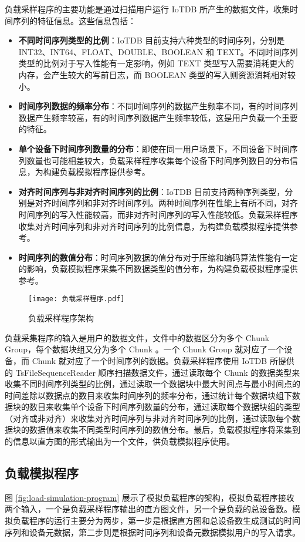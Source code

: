 负载采样程序的主要功能是通过扫描用户运行 IoTDB 所产生的数据文件，收集时间序列的特征信息。这些信息包括：
\begin{itemize}
  \item \textbf{不同时间序列类型的比例}：IoTDB 目前支持六种类型的时间序列，分别是 INT32、INT64、FLOAT、DOUBLE、BOOLEAN 和 TEXT。不同时间序列类型的比例对于写入性能有一定影响，例如 TEXT 类型写入需要消耗更大的内存，会产生较大的写前日志，而 BOOLEAN 类型的写入则资源消耗相对较小。
  \item \textbf{时间序列数据的频率分布}：不同时间序列的数据产生频率不同，有的时间序列数据产生频率较高，有的时间序列数据产生频率较低，这是用户负载一个重要的特征。
  \item \textbf{单个设备下时间序列数量的分布}：即使在同一用户场景下，不同设备下时间序列数量也可能相差较大，负载采样程序收集每个设备下时间序列数目的分布信息，为构建负载模拟程序提供参考。
  \item \textbf{对齐时间序列与非对齐时间序列的比例}：IoTDB 目前支持两种序列类型，分别是对齐时间序列和非对齐时间序列。两种时间序列在性能上有所不同，对齐时间序列的写入性能较高，而非对齐时间序列的写入性能较低。负载采样程序收集对齐时间序列和非对齐时间序列的比例信息，为构建负载模拟程序提供参考。
  \item \textbf{时间序列的数值分布}：时间序列数据的值分布对于压缩和编码算法性能有一定的影响，负载模拟程序采集不同数据类型的值分布，为构建负载模拟程序提供参考。
\end{itemize}

\begin{figure}
  \centering
  \texttt{[image: 负载采样程序.pdf]}
  \caption{负载采样程序架构}
  \label{fig:load-sampling-program}
\end{figure}

负载采集程序的输入是用户的数据文件，文件中的数据区分为多个 Chunk Group，每个数据块组又分为多个 Chunk 。一个 Chunk Group 就对应了一个设备，而 Chunk 就对应了一个时间序列的数据。负载采样程序使用 IoTDB 所提供的 TsFileSequenceReader 顺序扫描数据文件，通过读取每个 Chunk 的数据类型来收集不同时间序列类型的比例，通过读取一个数据块中最大时间点与最小时间点的时间差除以数据点的数目来收集时间序列的频率分布，通过统计每个数据块组下数据块的数目来收集单个设备下时间序列数量的分布，通过读取每个数据块组的类型（对齐或非对齐）来收集对齐时间序列与非对齐时间序列的比例，通过读取每个数据块的数据值来收集不同类型时间序列的数值分布。最后，负载模拟程序将采集到的信息以直方图的形式输出为一个文件，供负载模拟程序使用。

\subsection{负载模拟程序}
图 \ref{fig:load-simulation-program} 展示了模拟负载程序的架构，模拟负载程序接收两个输入，一个是负载采样程序输出的直方图文件，另一个是负载的总设备数。模拟负载程序的运行主要分为两步，第一步是根据直方图和总设备数生成测试的时间序列和设备元数据，第二步则是根据时间序列和设备元数据模拟用户的写入请求。

